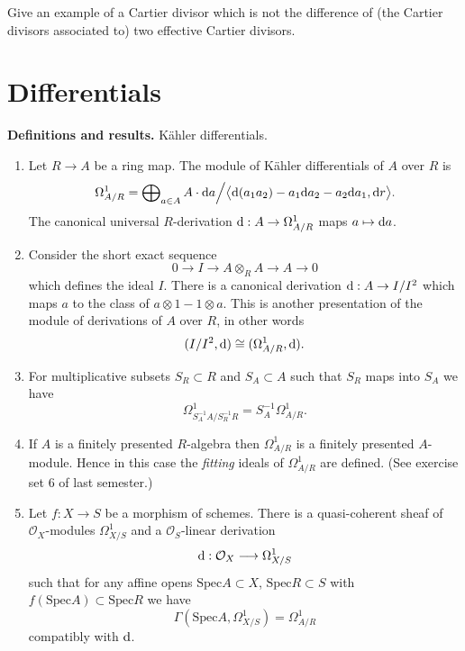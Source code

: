 \begin{exercise}
Give an example of a Cartier divisor
which is not the difference of (the Cartier divisors associated
to) two effective Cartier divisors.
\end{exercise}

\section{Differentials}
\label{section-differentials}

\noindent
{\bf Definitions and results.} K\"ahler differentials.
\begin{enumerate}
\item Let $R \to A$ be a ring map. The module of K\"ahler
differentials of $A$ over $R$ is 
$$
\Omega^1_{A/R} = \bigoplus\nolimits_{a\in A} A \cdot {\rm d}a \Big/
\big\langle {\rm d}(a_1a_2)-a_1{\rm d}a_2-a_2{\rm d}a_1, {\rm d}r\big\rangle.
$$
The canonical universal $R$-derivation ${\rm d} : A \to \Omega^1_{A/R}$ 
maps $a\mapsto {\rm d}a$.
\item Consider the short exact sequence
$$
0 \to I \to A\otimes_R A \to A \to 0
$$
which defines the ideal $I$. There is a canonical derivation
${\rm d} : A \to I/I^2$ which maps $a$ to the class of
$a\otimes 1 - 1 \otimes a$. This is another presentation of
the module of derivations of $A$ over $R$, in other words
$$
(I/I^2, {\rm d}) \cong (\Omega^1_{A/R}, {\rm d}).
$$
\item For multiplicative subsets $S_R \subset R$ and
$S_A \subset A$ such that $S_R$ maps into $S_A$ we have
$$
\Omega^1_{S_A^{-1}A / S_R^{-1}R} =
S_A^{-1}\Omega^1_{A/R}.
$$
\item If $A$ is a finitely presented $R$-algebra then
$\Omega^1_{A/R}$ is a finitely presented $A$-module. Hence in
this case the {\it fitting} ideals of $\Omega^1_{A/R}$ are defined.
(See exercise set 6 of last semester.)
\item Let $f : X \to S$ be a morphism of schemes. There is
a quasi-coherent sheaf of ${\mathcal O}_X$-modules $\Omega^1_{X/S}$
and a ${\mathcal O}_S$-linear derivation 
$$
{\rm d} : {\mathcal O}_X \longrightarrow \Omega^1_{X/S}
$$
such that for any affine opens $\text{Spec} A \subset X$, $\text{Spec} R \subset S$
with $f(\text{Spec} A) \subset \text{Spec} R$ we have
$$
\Gamma(\text{Spec} A, \Omega^1_{X/S}) = \Omega^1_{A/R}
$$
compatibly with ${\rm d}$.
\end{enumerate}

